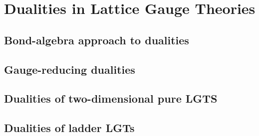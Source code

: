 \chapter{Dualities in Lattice Gauge Theories}
\label{chap:dualities_in_lattice_gauge_theories}


\section{Bond-algebra approach to dualities}
\label{sec:bond_algebra_approach_to_dualities}


\section{Gauge-reducing dualities}
\label{sec:gauge_reducing_dualities}


\section{Dualities of two-dimensional pure LGTS}
\label{sec:dualities_of_two_dimensional_pure_lgts}


\section{Dualities of ladder LGTs}
\label{sec:dualities_of_ladder_lgts}

